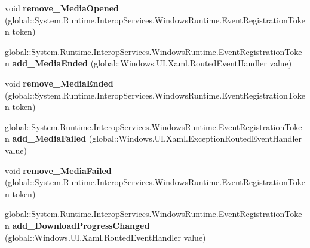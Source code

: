 \begin{DoxyCompactItemize}
void {\bfseries remove\+\_\+\+Media\+Opened} (global\+::\+System.\+Runtime.\+Interop\+Services.\+Windows\+Runtime.\+Event\+Registration\+Token token)
\item 
\mbox{\label{interface_windows_1_1_u_i_1_1_xaml_1_1_controls_1_1_i_media_element_a190c35f36005ac4360bc442c58c24107}} 
global\+::\+System.\+Runtime.\+Interop\+Services.\+Windows\+Runtime.\+Event\+Registration\+Token {\bfseries add\+\_\+\+Media\+Ended} (global\+::\+Windows.\+U\+I.\+Xaml.\+Routed\+Event\+Handler value)
\item 
\mbox{\label{interface_windows_1_1_u_i_1_1_xaml_1_1_controls_1_1_i_media_element_ae99093952bc4b7f856129d782cea9237}} 
void {\bfseries remove\+\_\+\+Media\+Ended} (global\+::\+System.\+Runtime.\+Interop\+Services.\+Windows\+Runtime.\+Event\+Registration\+Token token)
\item 
\mbox{\label{interface_windows_1_1_u_i_1_1_xaml_1_1_controls_1_1_i_media_element_ad3294027d9bad7858a991bb3a8b07ef8}} 
global\+::\+System.\+Runtime.\+Interop\+Services.\+Windows\+Runtime.\+Event\+Registration\+Token {\bfseries add\+\_\+\+Media\+Failed} (global\+::\+Windows.\+U\+I.\+Xaml.\+Exception\+Routed\+Event\+Handler value)
\item 
\mbox{\label{interface_windows_1_1_u_i_1_1_xaml_1_1_controls_1_1_i_media_element_afb81febce56b850ab6cff6148327aaea}} 
void {\bfseries remove\+\_\+\+Media\+Failed} (global\+::\+System.\+Runtime.\+Interop\+Services.\+Windows\+Runtime.\+Event\+Registration\+Token token)
\item 
\mbox{\label{interface_windows_1_1_u_i_1_1_xaml_1_1_controls_1_1_i_media_element_a57e937eee241a696cb1b801e5d5d4291}} 
global\+::\+System.\+Runtime.\+Interop\+Services.\+Windows\+Runtime.\+Event\+Registration\+Token {\bfseries add\+\_\+\+Download\+Progress\+Changed} (global\+::\+Windows.\+U\+I.\+Xaml.\+Routed\+Event\+Handler value)
\item 
\mbox{\label{interface_windows_1_1_u_i_1_1_xaml_1_1_controls_1_1_i_media_element_a8aaeaafe6a46fee402a829a599d1aae3}} 

\end{DoxyCompactItemize}
